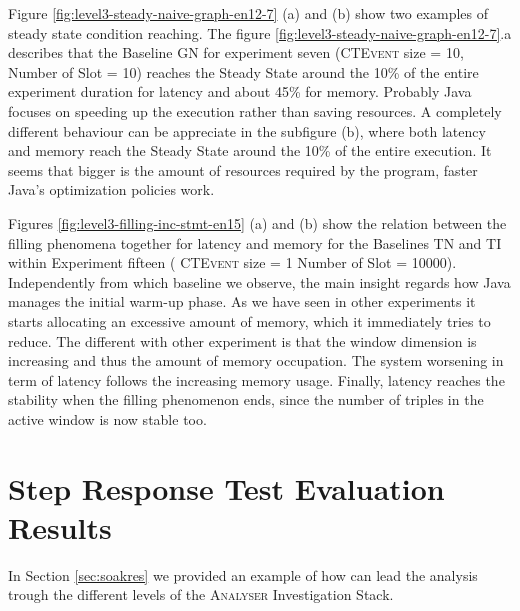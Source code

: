 Figure \ref{fig:level3-steady-naive-graph-en12-7} (a) and (b) show two examples of steady state condition reaching. The figure \ref{fig:level3-steady-naive-graph-en12-7}.a describes that the Baseline GN for experiment seven (\textsc{CTEvent} size = 10, Number of Slot = 10) reaches the Steady State around the 10\% of the entire experiment duration for latency and about 45\% for memory. 
Probably Java focuses on speeding up the execution rather than saving resources. A completely different behaviour can be appreciate in the subfigure (b), where both latency and memory reach the Steady State around the 10\% of the entire execution. It seems that bigger is the amount of resources required by the program, faster Java's optimization policies work.

Figures \ref{fig:level3-filling-inc-stmt-en15} (a) and (b) show the relation between the filling phenomena together for latency and memory for the Baselines TN and TI within Experiment fifteen ( \textsc{CTEvent} size = 1 Number of Slot = 10000). Independently from which baseline we observe, the main insight regards how Java manages the initial warm-up phase. As we have seen in other experiments it starts allocating an excessive amount of memory, which it immediately tries to reduce. The different with other experiment is that the window dimension is increasing and thus the amount of memory occupation. The system worsening in term of latency follows the increasing memory usage. Finally, latency reaches the stability when the filling phenomenon ends, since the number of triples in the active window is now stable too.















\pagebreak

\section{Step Response Test Evaluation Results}\label{sec:stressres}

In Section \ref{sec:soakres} we provided an example of how \name can lead the analysis trough the different levels of the \textsc{Analyser} Investigation Stack. 

